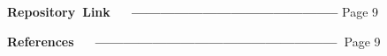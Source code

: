 \documentclass[12pt]{article}
\begin{document}
\vspace{\baselineskip}
\textbf{ Repository\ Link\ \ \ --------------------------------------------   }Page 9\par


\vspace{\baselineskip}
\textbf{ References\ \ \ ---------------------------------------------------\   }Page 9\par


\vspace{\baselineskip}

\vspace{\baselineskip}

\vspace{\baselineskip}
 \par


\vspace{\baselineskip}
\setlength{\parskip}{8.04pt}

\vspace{\baselineskip}

\vspace{\baselineskip}

\vspace{\baselineskip}

\vspace{\baselineskip}

\vspace{\baselineskip}

\vspace{\baselineskip}

\vspace{\baselineskip}

\vspace{\baselineskip}

\vspace{\baselineskip}

\vspace{\baselineskip}

\vspace{\baselineskip}

\vspace{\baselineskip}

\vspace{\baselineskip}

\vspace{\baselineskip}

\vspace{\baselineskip}

\vspace{\baselineskip}
\end{document}
